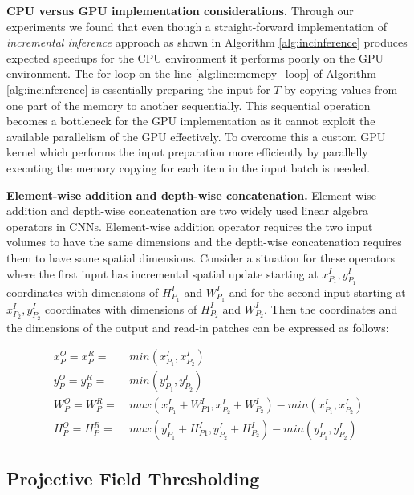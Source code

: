 \vspace{2mm}
\noindent \textbf{CPU versus GPU implementation considerations.}
Through our experiments we found that even though a straight-forward implementation of \textit{incremental inference} approach as shown in Algorithm \ref{alg:incinference} produces expected speedups for the CPU environment it performs poorly on the GPU environment.
The for loop on the line \ref{alg:line:memcpy_loop} of Algorithm \ref{alg:incinference} is essentially preparing the input for $T$ by copying values from one part of the memory to another sequentially.
This sequential operation becomes a bottleneck for the GPU implementation as it cannot exploit the available parallelism of the GPU effectively.
To overcome this a custom GPU kernel which performs the input preparation more efficiently by parallelly executing the memory copying for each item in the input batch is needed.


\vspace{2mm}
\noindent \textbf{Element-wise addition and depth-wise concatenation.}
Element-wise addition and depth-wise concatenation are two widely used linear algebra operators in CNNs.
Element-wise addition operator requires the two input volumes to have the same dimensions and the depth-wise concatenation requires them to have same spatial dimensions.
Consider a situation for these operators where the first input has incremental spatial update starting at $x^I_{P_1},y^I_{P_1}$ coordinates with dimensions of $H^I_{P_1}$ and $W^I_{P_1}$ and for the second input starting at $x^I_{P_2},y^I_{P_2}$ coordinates with dimensions of $H^I_{P_2}$ and $W^I_{P_2}$.
Then the coordinates and the dimensions of the output and read-in patches can be expressed as follows:

\begin{align}
\label{eqn:laxcoordinate}
x^O_P = x^R_P =&~ min(x^I_{P_1},x^I_{P_2})\\
\label{eqn:laycoordinate}
y^O_P = y^R_P =&~ min(y^I_{P_1},y^I_{P_2})\\
\label{eqn:lapatchwidth}
W^O_P = W^R_P =&~ max(x^I_{P_1}+W^I_{P1},x^I_{P_2}+W^I_{P_2})-min(x^I_{P_1},x^I_{P_2})\\
\label{eqn:lapatchheight}
H^O_P = H^R_P =&~ max(y^I_{P_1}+H^I_{P1},y^I_{P_2}+H^I_{P_2})-min(y^I_{P_1},y^I_{P_2})
\end{align}


\subsection{Projective Field Thresholding}

